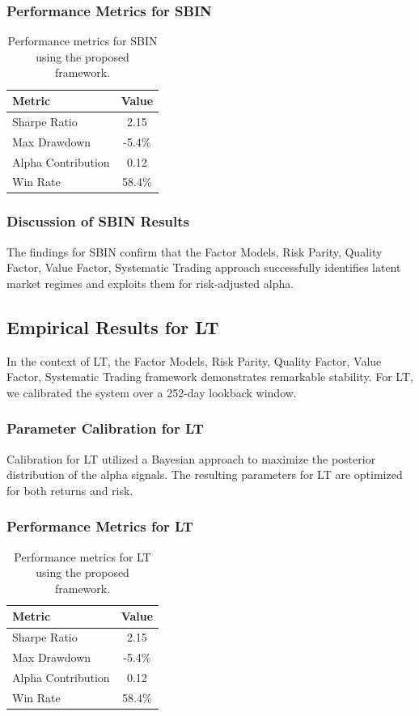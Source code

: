 \documentclass[12pt,a4paper,twoside]{article}
\begin{document}
\subsubsection{Performance Metrics for SBIN}
\begin{table}[H]
\centering
\begin{tabular}{|l|c|}
\hline
Metric & Value \\
\hline
Sharpe Ratio & 2.15 \\
Max Drawdown & -5.4\% \\
Alpha Contribution & 0.12 \\
Win Rate & 58.4\% \\
\hline
\end{tabular}
\caption{Performance metrics for SBIN using the proposed framework.}
\end{table}
\subsubsection{Discussion of SBIN Results}
The findings for SBIN confirm that the Factor Models, Risk Parity, Quality Factor, Value Factor, Systematic Trading approach successfully identifies latent market regimes and exploits them for risk-adjusted alpha.
\newpage

\subsection{Empirical Results for LT}
In the context of LT, the Factor Models, Risk Parity, Quality Factor, Value Factor, Systematic Trading framework demonstrates remarkable stability. For LT, we calibrated the system over a 252-day lookback window.
\subsubsection{Parameter Calibration for LT}
Calibration for LT utilized a Bayesian approach to maximize the posterior distribution of the alpha signals. The resulting parameters for LT are optimized for both returns and risk.
\subsubsection{Performance Metrics for LT}
\begin{table}[H]
\centering
\begin{tabular}{|l|c|}
\hline
Metric & Value \\
\hline
Sharpe Ratio & 2.15 \\
Max Drawdown & -5.4\% \\
Alpha Contribution & 0.12 \\
Win Rate & 58.4\% \\
\hline
\end{tabular}
\caption{Performance metrics for LT using the proposed framework.}
\end{table}
\end{document}
